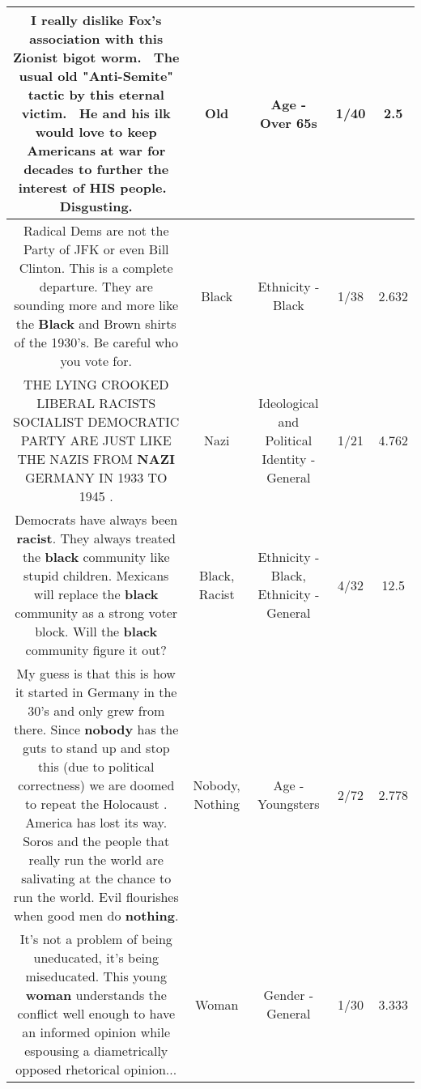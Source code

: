 \documentclass[11pt]{article}
\newlength\mylength
\begin{document}
\begin{center}
\begin{longtable}{|C{.65\mylength}|C{.30\mylength}|C{.12\mylength}|C{.12\mylength}|C{.12\mylength}|}
  \small I really dislike Fox's association with this Zionist bigot worm.  The usual \textbf{old} "Anti-Semite" tactic by this eternal victim.  He and his ilk would love to keep Americans at war for decades to further the interest of HIS people.  Disgusting.\normalsize   & Old & Age - Over 65s & 1/40 & 2.5 \\  \hline
  \small Radical Dems are not the Party of JFK or even Bill Clinton. This is a complete departure. They are sounding more and more like the \textbf{Black} and Brown shirts of the 1930's. Be careful who you vote for.\normalsize   & Black & Ethnicity - Black & 1/38 & 2.632 \\  \hline
  \small THE LYING CROOKED LIBERAL RACISTS SOCIALIST DEMOCRATIC PARTY ARE JUST LIKE THE NAZIS FROM \textbf{NAZI} GERMANY IN 1933 TO 1945 .\normalsize   & Nazi &  Ideological and Political Identity - General & 1/21 & 4.762 \\  \hline
  \small Democrats have always been \textbf{racist}. They always treated the \textbf{black} community like stupid children. Mexicans will replace the \textbf{black} community as a strong voter block. Will the \textbf{black} community figure it out?\normalsize   & Black, Racist & Ethnicity - Black, Ethnicity - General & 4/32 & 12.5 \\  \hline
  \small My guess is that this is how it started in Germany in the 30's and only grew from there. Since \textbf{nobody} has the guts to stand up and stop this (due to political correctness) we are doomed to repeat the Holocaust .  America has lost its way. Soros and the people that really run the world are  salivating at the chance to run the world. Evil flourishes when good men do \textbf{nothing}.\normalsize   & Nobody, Nothing & Age - Youngsters & 2/72 & 2.778 \\  \hline
  \small It's not a problem of being uneducated, it's being miseducated. This young \textbf{woman} understands the conflict well enough to have an informed opinion while espousing a diametrically opposed rhetorical opinion...\normalsize   & Woman & Gender - General & 1/30 & 3.333 \\  \hline

\end{longtable}
\end{center}
\end{document}
